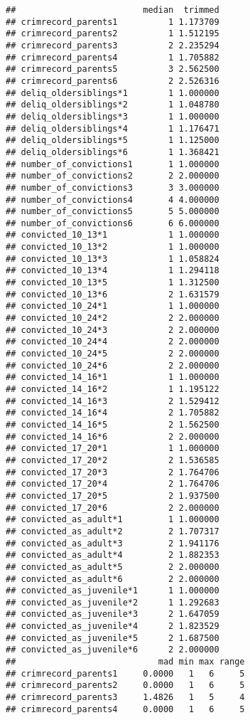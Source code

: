 \documentclass[]{tufte-handout}
\begin{document}
\begin{verbatim}
##                         median  trimmed
## crimrecord_parents1          1 1.173709
## crimrecord_parents2          1 1.512195
## crimrecord_parents3          2 2.235294
## crimrecord_parents4          1 1.705882
## crimrecord_parents5          3 2.562500
## crimrecord_parents6          2 2.526316
## deliq_oldersiblings*1        1 1.000000
## deliq_oldersiblings*2        1 1.048780
## deliq_oldersiblings*3        1 1.000000
## deliq_oldersiblings*4        1 1.176471
## deliq_oldersiblings*5        1 1.125000
## deliq_oldersiblings*6        1 1.368421
## number_of_convictions1       1 1.000000
## number_of_convictions2       2 2.000000
## number_of_convictions3       3 3.000000
## number_of_convictions4       4 4.000000
## number_of_convictions5       5 5.000000
## number_of_convictions6       6 6.000000
## convicted_10_13*1            1 1.000000
## convicted_10_13*2            1 1.000000
## convicted_10_13*3            1 1.058824
## convicted_10_13*4            1 1.294118
## convicted_10_13*5            1 1.312500
## convicted_10_13*6            2 1.631579
## convicted_10_24*1            1 1.000000
## convicted_10_24*2            2 2.000000
## convicted_10_24*3            2 2.000000
## convicted_10_24*4            2 2.000000
## convicted_10_24*5            2 2.000000
## convicted_10_24*6            2 2.000000
## convicted_14_16*1            1 1.000000
## convicted_14_16*2            1 1.195122
## convicted_14_16*3            2 1.529412
## convicted_14_16*4            2 1.705882
## convicted_14_16*5            2 1.562500
## convicted_14_16*6            2 2.000000
## convicted_17_20*1            1 1.000000
## convicted_17_20*2            2 1.536585
## convicted_17_20*3            2 1.764706
## convicted_17_20*4            2 1.764706
## convicted_17_20*5            2 1.937500
## convicted_17_20*6            2 2.000000
## convicted_as_adult*1         1 1.000000
## convicted_as_adult*2         2 1.707317
## convicted_as_adult*3         2 1.941176
## convicted_as_adult*4         2 1.882353
## convicted_as_adult*5         2 2.000000
## convicted_as_adult*6         2 2.000000
## convicted_as_juvenile*1      1 1.000000
## convicted_as_juvenile*2      1 1.292683
## convicted_as_juvenile*3      2 1.647059
## convicted_as_juvenile*4      2 1.823529
## convicted_as_juvenile*5      2 1.687500
## convicted_as_juvenile*6      2 2.000000
##                            mad min max range
## crimrecord_parents1     0.0000   1   6     5
## crimrecord_parents2     0.0000   1   6     5
## crimrecord_parents3     1.4826   1   5     4
## crimrecord_parents4     0.0000   1   6     5

\end{verbatim}
\end{document}
